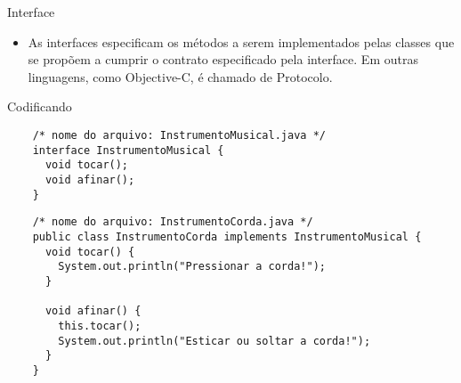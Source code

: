 \begin{frame}[fragile]{Interface}
  \small
  \begin{itemize}
  \item As interfaces especificam os métodos a serem implementados
    pelas classes que se propõem a cumprir o contrato especificado
    pela interface. Em outras linguagens, como Objective-C, é chamado
    de \alert{Protocolo}.
  \end{itemize}
    \begin{center}
  \end{center}
\end{frame}  

\begin{frame}[fragile]{Codificando}
  
  \begin{lstlisting}
    /* nome do arquivo: InstrumentoMusical.java */
    interface InstrumentoMusical {
      void tocar();
      void afinar();
    }
  \end{lstlisting}
  
  \begin{lstlisting}
    /* nome do arquivo: InstrumentoCorda.java */
    public class InstrumentoCorda implements InstrumentoMusical {
      void tocar() {
        System.out.println("Pressionar a corda!");
      }
      
      void afinar() {
        this.tocar();
        System.out.println("Esticar ou soltar a corda!");
      }
    }
  \end{lstlisting}
\end{frame}

